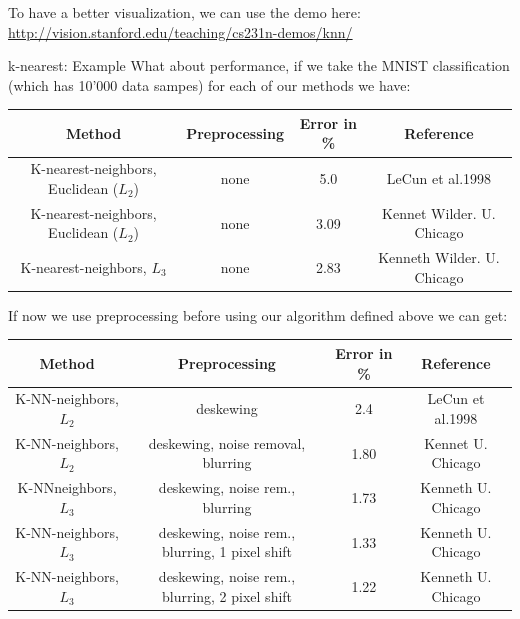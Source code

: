 \begin{framedremark}
To have a better visualization, we can use the demo here:
\href{http://vision.stanford.edu/teaching/cs231n-demos/knn/}{http://vision.stanford.edu/teaching/cs231n-demos/knn/}
\end{framedremark}
\begin{parag}{k-nearest: Example}
    What about performance, if we take the MNIST classification (which has 10'000 data sampes) for each of our methods we have:
\end{parag}
	\begin{center}
	\begin{tabular}{|c|c|c|c|}
		\hline
		Method & Preprocessing & Error in \% & Reference \\
		\hline
		K-nearest-neighbors, Euclidean ($L_2$) & none & 5.0 & LeCun et al.1998 \\
		\hline
		K-nearest-neighbors, Euclidean ($L_2$) & none & 3.09 & Kennet Wilder. U. Chicago \\
		\hline 
		K-nearest-neighbors, $L_3$ & none & 2.83 & Kenneth Wilder. U. Chicago \\
		\hline 
	\end{tabular}
	\end{center}
	If now we use preprocessing before using our algorithm defined above we can get:

	\begin{center}
	\begin{tabular}{|c|c|c|c|}
		\hline
		Method & Preprocessing & Error in \% & Reference \\
		\hline
		K-NN-neighbors, $L_2$ & deskewing & 2.4 & LeCun et al.1998 \\
		\hline
		K-NN-neighbors,  $L_2$ & deskewing, noise removal, blurring & 1.80 & Kennet U. Chicago \\
		\hline 
		K-NNneighbors, $L_3$ & deskewing, noise rem., blurring & 1.73 & Kenneth U. Chicago \\
		\hline 
		K-NN-neighbors, $L_3$ & deskewing, noise rem., blurring, 1 pixel shift & 1.33 & Kenneth U. Chicago \\
		\hline 
		K-NN-neighbors, $L_3$ & deskewing, noise rem., blurring, 2 pixel shift & 1.22 & Kenneth U. Chicago \\
		\hline 
	\end{tabular}
	\end{center}
	
